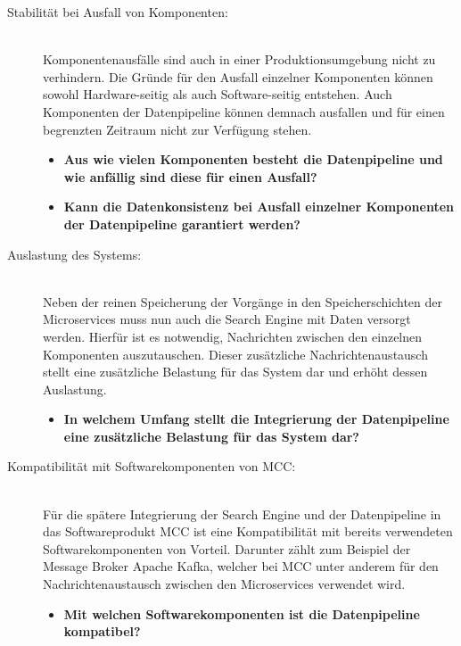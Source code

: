 \begin{description}
    \item[Stabilität bei Ausfall von Komponenten:]\hfill \\
    Komponentenausfälle sind auch in einer Produktionsumgebung nicht zu verhindern. Die Gründe für den Ausfall einzelner Komponenten können sowohl Hardware-seitig als auch Software-seitig entstehen. Auch Komponenten der Datenpipeline können demnach ausfallen und für einen begrenzten Zeitraum nicht zur Verfügung stehen.

    \begin{itemize}
        \item \textbf{Aus wie vielen Komponenten besteht die Datenpipeline und wie anfällig sind diese für einen Ausfall?}
        \item \textbf{Kann die Datenkonsistenz bei Ausfall einzelner Komponenten der Datenpipeline garantiert werden?}
    \end{itemize}
    
    \item[Auslastung des Systems:]\hfill \\
    Neben der reinen Speicherung der Vorgänge in den Speicherschichten der Microservices muss nun auch die Search Engine mit Daten versorgt werden. Hierfür ist es notwendig, Nachrichten zwischen den einzelnen Komponenten auszutauschen. Dieser zusätzliche Nachrichtenaustausch stellt eine zusätzliche Belastung für das System dar und erhöht dessen Auslastung.

    \begin{itemize}
        \item \textbf{In welchem Umfang stellt die Integrierung der Datenpipeline eine zusätzliche Belastung für das System dar?}
    \end{itemize}

    \item[Kompatibilität mit Softwarekomponenten von MCC:]\hfill \\
    Für die spätere Integrierung der Search Engine und der Datenpipeline in das Softwareprodukt MCC ist eine Kompatibilität mit bereits verwendeten Softwarekomponenten von Vorteil. Darunter zählt zum Beispiel der Message Broker \glqq Apache Kafka\grqq{}, welcher bei MCC unter anderem für den Nachrichtenaustausch zwischen den Microservices verwendet wird.

    \begin{itemize}
        \item \textbf{Mit welchen Softwarekomponenten ist die Datenpipeline kompatibel?}
    \end{itemize}

\end{description}

